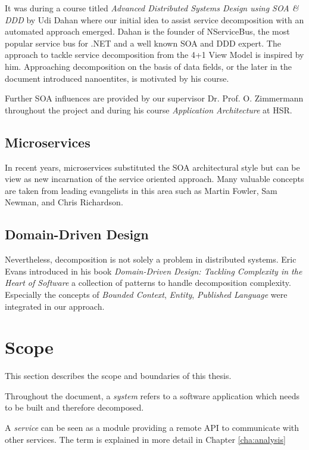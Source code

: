 It was during a course titled \textit{Advanced Distributed Systems Design using SOA \& DDD} by Udi Dahan where our initial idea to assist service decomposition with an automated approach emerged. Dahan is the founder of NServiceBus, the most popular service bus for .NET and a well known  \gls{SOA} and \gls{DDD} expert. The approach to tackle service decomposition from the 4+1 View Model\cite{fourPlusOne} is inspired by him. Approaching decomposition on the basis of data fields, or the later in the document introduced nanoentites, is motivated by his course.

Further \gls{SOA} influences are provided by our supervisor Dr. Prof. O. Zimmermann throughout the project and during his course \textit{Application Architecture} at \gls{HSR}.

\subsection{Microservices}

In recent years, microservices substituted the \gls{SOA} architectural style but can be view as new incarnation of the service oriented approach. Many valuable concepts are taken from leading evangelists in this area such as Martin Fowler, Sam Newman, and Chris Richardson. 

\subsection{Domain-Driven Design}

Nevertheless, decomposition is not solely a problem in distributed systems. Eric Evans introduced in his book \textit{Domain-Driven Design: Tackling Complexity in the Heart of Software}\cite{evans2003domain} a collection of patterns to handle decomposition complexity. Especially the concepts of \textit{Bounded Context}, \textit{Entity}, \textit{Published Language} were integrated in our approach.

\section{Scope}

This section describes the scope and boundaries of this thesis. 

Throughout the document, a \textit{system} refers to a software application which needs to be built and therefore decomposed. 

A \textit{service} can be seen as a module providing a remote \gls{API} to communicate with other services. The term is explained in more detail in Chapter \ref{cha:analysis}


